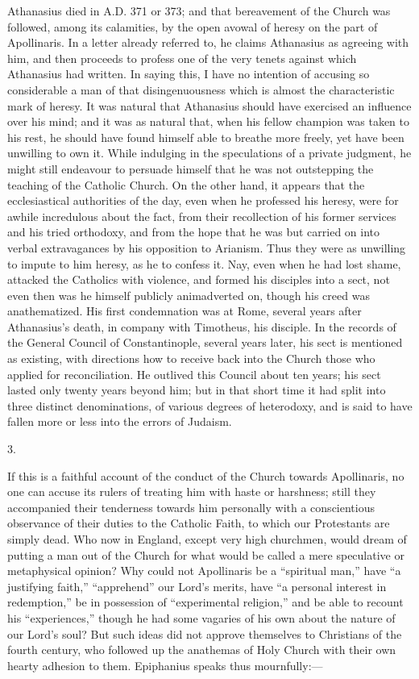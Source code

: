 Athanasius died in A.D. 371 or 373; and that
bereavement of the Church was followed, among its calamities, by the
open avowal of heresy on the part of Apollinaris. In a letter already
referred to, he claims Athanasius as agreeing with him, and then
proceeds to profess one of the very tenets against which Athanasius
had written. In saying this, I have no intention of accusing so
considerable a man of that disingenuousness which is almost the
characteristic mark of heresy. It was natural that Athanasius should
have exercised an influence over his mind; and it was as natural that,
when his fellow champion was taken to his rest, he should have found
himself able to breathe more freely, yet have been unwilling to own
it. While indulging in the speculations of a private judgment, he
might still endeavour to persuade himself that he was not outstepping
the teaching of the Catholic Church. On the other hand, it appears
that the ecclesiastical authorities of the day, even when he professed
his heresy, were for awhile incredulous about the fact, from their
recollection of his former services and his tried orthodoxy, and from
the hope that he was but carried on into verbal extravagances by his
opposition to Arianism. Thus they were as unwilling to impute to him
heresy, as he to confess it. Nay, even when he had lost shame,
attacked the Catholics with violence, and formed his disciples into a
sect, not even then was he himself publicly animadverted on, though
his creed was anathematized. His first condemnation was at Rome,
several years after Athanasius's death, in company with Timotheus, his
disciple. In the records of the General Council of Constantinople,
several years later, his sect is mentioned as existing, with
directions how to receive back into the Church those who applied
for reconciliation. He outlived this Council about ten years; his sect
lasted only twenty years beyond him; but in that short time it had
split into three distinct denominations, of various degrees of
heterodoxy, and is said to have fallen more or less into the errors of
Judaism.

3.

If this is a faithful account of the conduct of the Church towards
Apollinaris, no one can accuse its rulers of treating him with haste
or harshness; still they accompanied their tenderness towards him
personally with a conscientious observance of their duties to the
Catholic Faith, to which our Protestants are simply dead. Who now in
England, except very high churchmen, would dream of putting a man out
of the Church for what would be called a mere speculative or
metaphysical opinion? Why could not Apollinaris be a ``spiritual
man,'' have ``a justifying faith,'' ``apprehend''
our Lord's merits, have ``a personal interest in redemption,''
be in possession of ``experimental religion,'' and be able to
recount his ``experiences,'' though he had some vagaries of
his own about the nature of our Lord's soul? But such ideas did not
approve themselves to Christians of the fourth century, who followed
up the anathemas of Holy Church with their own hearty adhesion to
them. Epiphanius speaks thus mournfully:—

